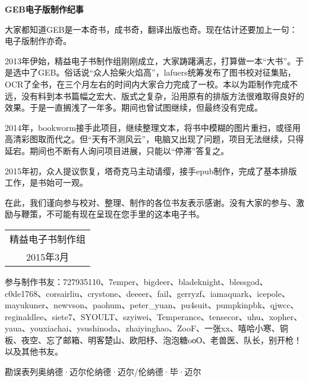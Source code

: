 \clearpage

\begin{center}\bfseries\large
GEB电子版制作纪事
\end{center}

\bigskip

\kaishu\small

大家都知道GEB是一本奇书，成书奇，翻译出版也奇。现在估计还要加上一句：电子版制作亦奇。

2013年伊始，精益电子书制作组刚刚成立，大家踌躇满志，打算做一本“大书”。于是选中了GEB。俗话说“众人拾柴火焰高”，lafuers统筹发布了图书校对征集贴，OCR了全书，在三个月左右的时间内大家合力完成了一校。本以为距制作完成不远，没有料到本书篇幅之宏大、版式之复杂，沿用原有的排版方法很难取得良好的效果。于是一直搁浅了一年多。期间也曾试图继续，但最终没有完成。

2014年，bookworm接手此项目，继续整理文本，将书中模糊的图片重扫，或径用高清彩图取而代之。但“天有不测风云”，电脑又出现了问题，项目无法继续，只得延宕。期间也不断有人询问项目进展，只能以“停滞”答复之。

2015年初，众人提议恢复，塔奇克马主动请缨，接手epub制作，完成了基本排版工作，是书始可一观。

在此，我们谨向参与校对、整理、制作的各位书友表示感谢。没有大家的参与、激励与鞭策，不可能有现在呈现在您手里的这本电子书。

\medskip

\hfill
\begin{tabular}{c@{\qquad}}
精益电子书制作组\\
2015年3月
\end{tabular}

\vfill

\normalfont
\textsf{参与制作书友}：727935110、7emper、bigdeer、bladeknight、blessgod、c0de1768、corsairliu、crystone、deeeer、fail、gerryzf、iamaquark、icepole、mayukuner、newvson、paohum、peter\_yuan、pu4suit、pumpkinpbk、qjwcc、reginaldlee、siete7、SYOULT、szyiwei、Temperance、tensecor、uhu、xopher、yaua、youxiachai、ysushinoda、zhaiyinghao、ZooF、一张xx、嘻哈小寒、铜板、夜空、忘了邮箱、明客楚山、欧阳杼、泡泡糖{\Cyrillic oоО}、老兽医、队长，别开枪！以及其他书友。

\textsf{勘误表}\quad 列奥纳德·迈尔\quad 伦纳德·迈尔/伦纳德·毕·迈尔

\clearpage
\endgroup


